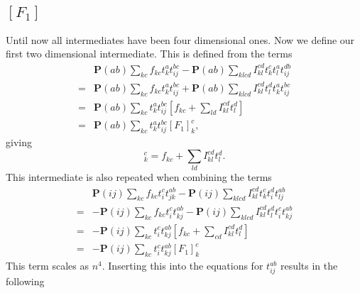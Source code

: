 \documentclass[a4paper,norsk,11pt,twoside]{report}
\begin{document}
\subsection{$[F_1]$}
Until now all intermediates have been four dimensional ones. Now we
define our first two dimensional intermediate. This is defined from
the terms
\begin{align}
& \textbf{P}(ab) \sum_{kc} f_{kc} t_k^a t_{ij}^{bc}
- \textbf{P}(ab) \sum_{klcd} I_{kl}^{cd} t_k^c t_l^a t_{ij}^{db} \nonumber \\ 
= & 
\textbf{P}(ab) \sum_{kc} f_{kc} t_k^a t_{ij}^{bc}
+ \textbf{P}(ab) \sum_{klcd} I_{kl}^{cd} t_l^d t_k^a t_{ij}^{bc} \nonumber \\
= &
\textbf{P}(ab) \sum_{kc} t_k^a t_{ij}^{bc} \left[ f_{kc} + \sum_{ld} I_{kl}^{cd} t_l^d \right] \nonumber \\
= &
\textbf{P}(ab) \sum_{kc} t_k^a t_{ij}^{bc} [F_1]_k^c,
\end{align}
giving
\begin{equation}
[F_1]_k^c = f_{kc} + \sum_{ld} I_{kl}^{cd} t_l^d . \label{intermedF1}
\end{equation}
This intermediate is also repeated when combining the terms
\begin{align}
& \textbf{P}(ij) \sum_{kc} f_{kc} t_i^c t_{jk}^{ab}
- \textbf{P}(ij) \sum_{klcd} I_{kl}^{cd} t_k^c t_i^d t_{lj}^{ab} \nonumber \\ 
= &
- \textbf{P}(ij) \sum_{kc} f_{kc} t_i^c t_{kj}^{ab}
- \textbf{P}(ij) \sum_{klcd} I_{kl}^{cd} t_l^d t_i^c t_{kj}^{ab} \nonumber \\
= &
- \textbf{P}(ij) \sum_{kc} t_i^c t_{kj}^{ab} \left[
f_{kc} + \sum_{cd} I_{kl}^{cd} t_l^d \right] \nonumber \\ 
= &
- \textbf{P}(ij) \sum_{kc} t_i^c t_{kj}^{ab} [F_1]_k^c
\end{align}
This term scales as $n^4$. Inserting this into the equations for $t_{ij}^{ab}$ results in the following
\end{document}
